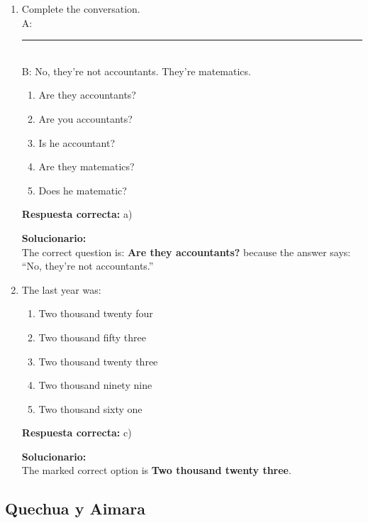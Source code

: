 \begin{enumerate}

	
	\item Complete the conversation.\\
	A: \rule{6cm}{0.4pt}\\
	B: No, they’re not accountants. They’re matematics.
	\begin{enumerate}[label=\alph*)]
		\item Are they accountants?
		\item Are you accountants?
		\item Is he accountant?
		\item Are they matematics?
		\item Does he matematic?
	\end{enumerate}
	\textbf{Respuesta correcta:} a)
	
	\vspace{2mm}
	\textbf{Solucionario:}\\
	The correct question is: \textbf{Are they accountants?} because the answer says: “No, they’re not accountants.”
	
	\vspace{6mm}
	
	\item The last year was:
	\begin{enumerate}[label=\alph*)]
		\item Two thousand twenty four
		\item Two thousand fifty three
		\item Two thousand twenty three
		\item Two thousand ninety nine
		\item Two thousand sixty one
	\end{enumerate}
	\textbf{Respuesta correcta:} c)
	
	\vspace{2mm}
	\textbf{Solucionario:}\\
	The marked correct option is \textbf{Two thousand twenty three}.
	
	\vspace{6mm}
	
\end{enumerate}

\subsection*{Quechua y Aimara}

